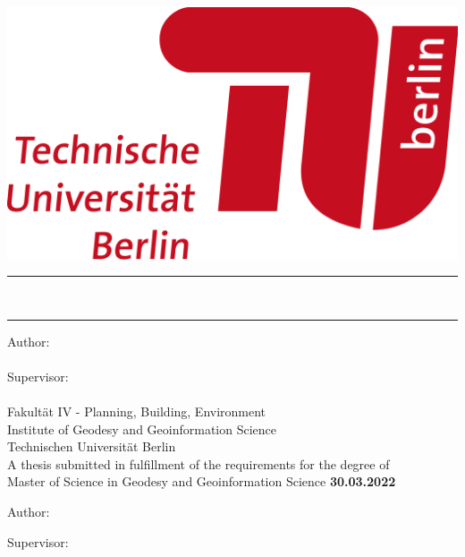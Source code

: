 

    
\begin{titlepage}
    \begin{center}
        \includegraphics[width=.25\textwidth,right]{picture/image1.png}
            \\
        \vspace*{0.8cm}
        {\Huge %
            \rule[1 ex]{\textwidth}{2 pt} %
            \textbf{\printTitle}\\
            \rule[-1 ex]{\textwidth}{2 pt} %
            }
        \vfil
        {\Large Author:} \\[0.5cm]
        { %
            {\Large \textbf{\printAuthor}} \\[0.2cm]
            }
        \vfil
        {\Large Supervisor: }\\ [0.5cm]
        { %
            {\Large \textbf{\printSupervisor}} \\[0.2cm]
            }
        \vfil
        {Fakult\"at IV - Planning, Building, Environment \\Institute of Geodesy and Geoinformation Science  \\ Technischen Universit\"at Berlin } \\[2 pt]
        \vfil
        {A thesis submitted in fulfillment of the requirements for the degree of \\ Master of Science in Geodesy and Geoinformation Science}
        \vfil
        {\large\textbf{30.03.2022} \printDate}
    \end{center}
\end{titlepage}

\restoregeometry


\hfill
\vfill

\noindent \textit{\printTitle} 

\bigskip

\noindent Author:\\
{\printAuthor}

\medskip

\noindent Supervisor: \\
{\printSupervisor}
